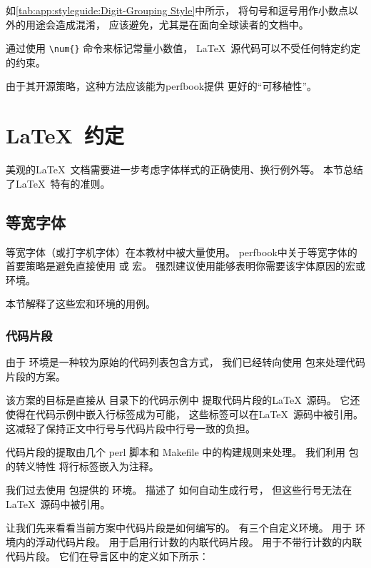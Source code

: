 如\cref{tab:app:styleguide:Digit-Grouping Style}中所示，
将句号和逗号用作小数点以外的用途会造成混淆，
应该避免，尤其是在面向全球读者的文档中。

通过使用 \verb|\num{}| 命令来标记常量小数值，
\LaTeX\ 源代码可以不受任何特定约定的约束。

由于其开源策略，这种方法应该能为perfbook提供
更好的“可移植性”。

\section{\LaTeX\ 约定}
\label{sec:app:styleguide:LaTeX Conventions}

美观的\LaTeX\ 文档需要进一步考虑字体样式的正确使用、换行例外等。
本节总结了\LaTeX\ 特有的准则。

\subsection{等宽字体}
\label{sec:app:styleguide:Monospace Font}

等宽字体（或打字机字体）在本教材中被大量使用。
perfbook中关于等宽字体的首要策略是避免直接使用 \qco{\\texttt} 或 \qco{\\tt} 宏。
强烈建议使用能够表明你需要该字体原因的宏或环境。

本节解释了这些宏和环境的用例。

\subsubsection{代码片段}
\label{sec:app:styleguide:Code Snippet}

由于  环境是一种较为原始的代码列表包含方式，
我们已经转向使用  包来处理代码片段的方案。

该方案的目标是直接从  目录下的代码示例中
提取代码片段的\LaTeX\ 源码。
它还使得在代码示例中嵌入行标签成为可能，
这些标签可以在\LaTeX\ 源码中被引用。
这减轻了保持正文中行号与代码片段中行号一致的负担。

代码片段的提取由几个 perl 脚本和 Makefile 中的构建规则来处理。
我们利用  包的转义特性
将行标签嵌入为注释。

我们过去使用  包提供的  环境。
 描述了
 如何自动生成行号，
但这些行号无法在\LaTeX\ 源码中被引用。

让我们先来看看当前方案中代码片段是如何编写的。
 有三个自定义环境。
 用于  环境内的浮动代码片段。
 用于启用行计数的内联代码片段。
 用于不带行计数的内联代码片段。
它们在导言区中的定义如下所示：

